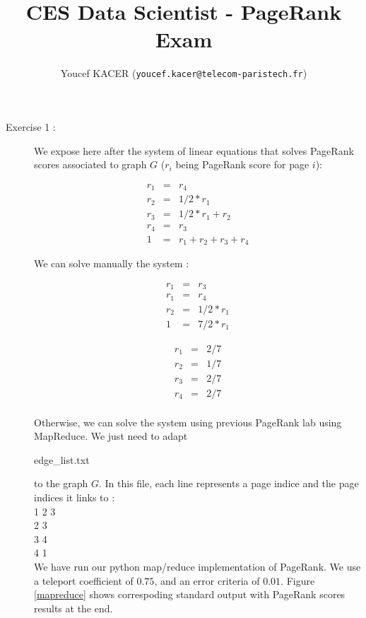 \documentclass[pdftex,a4paper,DIV15]{scrartcl}
\title{
CES Data Scientist - PageRank Exam}
\author{Youcef KACER (\texttt{youcef.kacer@telecom-paristech.fr})}
\begin{document}
\maketitle


\begin{description} %

\item[Exercise 1 :] We expose here after the system of linear equations that solves PageRank scores associated to graph $G$ ($r_{i}$ being PageRank score for page $i$):

\begin{eqnarray*} %
r_1 &=& r_4\\
r_2 &=& 1/2*r_1\\
r_3 &=& 1/2*r_1 + r_2\\
r_4 &=& r_3\\
1   &=& r_1 + r_2 + r_3 + r_4
\end{eqnarray*}

We can solve manually the system :

\begin{eqnarray*} %
r_1 &=& r_3\\
r_1 &=& r_4\\
r_2 &=& 1/2*r_1 \\
1   &=& 7/2*r_1
\end{eqnarray*}

\begin{eqnarray*} %
r_1 &=& 2/7\\
r_2 &=& 1/7\\
r_3 &=& 2/7\\
r_4 &=& 2/7
\end{eqnarray*}
\\

Otherwise, we can solve the system using previous PageRank lab using MapReduce. We just need to adapt \begin{itshape}edge\_list.txt\end{itshape} to the graph $G$. 
In this file, each line represents a page indice and the page indices it links to :\\

1 2 3\\
2 3\\
3 4\\
4 1\\

We have run our python map/reduce implementation of PageRank. We use a teleport coefficient of $0.75$, and an error criteria of $0.01$. Figure \ref{mapreduce} shows correspoding standard output with 
PageRank scores results at the end.


\end{description}
\end{document}
